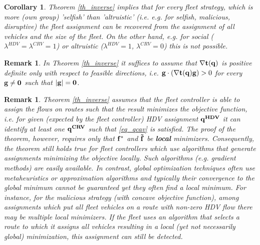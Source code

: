 \documentclass[a4paper,11pt]{article}
\newtheorem{remark}[theorem]{Remark}
\newtheorem{corollary}[theorem]{Corollary}
\begin{document}
\begin{corollary}
Theorem \ref{th_inverse} implies that for every fleet strategy, which is more (own group) 'selfish' than 'altruistic' (i.e. e.g. for selfish, malicious, disruptive) the fleet assignment can be recovered from the assignment of all vehicles and the size of the fleet. On the other hand, e.g. for social ($\lambda^{HDV} = \lambda^{CRV} = 1$) or altruistic ($\lambda^{HDV} = 1$, $\lambda^{CRV} = 0$) this is not possible. 
\end{corollary}

\begin{remark}
\label{rem_feasibledir}
In Theorem \ref{th_inverse} it suffices to assume that $\bold{\nabla t(q)}$ is positive definite only with respect to feasible directions, i.e. $\bold{g}\cdot (\nabla \bold{t}(\bold{q}) {\bold{g}})>0$ for every $\bold{g} \neq \bold{0}$ such that $|\bold{g}|=\bold{0}$. 
\end{remark}

\begin{remark}
\label{rem_localmin}
Theorem \ref{th_inverse} assumes that the fleet controller is able to assign the flows on routes such that the result minimizes the objective function, i.e. for given (expected by the fleet controller) HDV assignment $\bold{q^{HDV}}$ it can identify at least one $\bold{q^{CRV}}$ such that \eqref{eq_qcav} is satisfied. The proof of the theorem, however, requires only that $\bold{f}^*$ and $\bold{\tilde{f}}$ be {\bf local} minimizers. Consequently, the theorem still holds true for fleet controllers which use algorithms that generate assignments minimizing the objective locally. Such algorithms (e.g. gradient methods) are easily available. In contrast, global optimization techniques often use metaheuristics \cite{Metaheuristics} or approximation algorithms \cite{ApproxAlgos} and typically their convergence to the global minimum cannot be guaranteed yet they often find a local minimum. For instance, for the malicious strategy (with concave objective function), among assignments which put all fleet vehicles on a route with non-zero HDV flow there may be multiple local minimizers. If the fleet uses an algorithm that selects a route to which it assigns all vehicles resulting in a local (yet not necessarily global) minimization, this assignment can still be detected. 
\end{remark}
\end{document}
